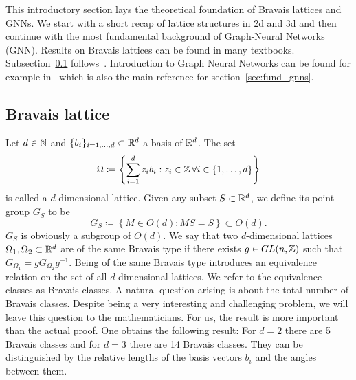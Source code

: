 This introductory section lays the theoretical foundation of Bravais lattices and GNNs. 
We start with a short recap of lattice structures in 2d and 3d and then continue with 
the most fundamental background of Graph-Neural Networks (GNN). 
Results on Bravais lattices can be found in many textbooks. Subsection~\ref{sec:brav_latt} follows~\cite{symGroupsApplications}.
Introduction to Graph Neural Networks can be found for example in~\cite{IntroMessagePassing} which is also the main reference for section~\ref{sec:fund_gnns}.

\subsection{Bravais lattice}
\label{sec:brav_latt}
Let $d\in\mathbb{N}$ and $\{b_i\}_{i=1,\dots,d}\subset \mathbb{R}^d$ a basis of $\mathbb{R}^d$. The set 
\begin{equation*}
    \Omega\coloneq\left\{\sum_{i=1}^{d}z_i b_i: z_i\in\mathbb{Z}\,\forall i\in\{1,\dots,d\}\right\}
\end{equation*}
is called a $d$-dimensional lattice. Given any subset $S\subset\mathbb{R}^d$, we define its point group $G_S$ to be
\begin{equation*}
    G_S\coloneq \left\{M\in O(d) : MS=S\right\}\subset O(d).
\end{equation*}
$G_S$ is obviously a subgroup of $O(d)$. We say that two $d$-dimensional lattices $\Omega_1, \Omega_2\subset \mathbb{R}^d$ are of the same Bravais type if
there exists $g\in GL(n,\mathbb{Z})$ such that $G_{\Omega_1}=g G_{\Omega_2} g^{-1}$. 
Being of the same Bravais type introduces an equivalence relation on the set of all $d$-dimensional lattices. We refer to the equivalence classes as Bravais classes.
A natural question arising is about the total number of Bravais classes. Despite being a very interesting and challenging problem,
we will leave this question to the mathematicians. For us, the result is more important than the actual proof. One obtains the following result:
For $d=2$ there are 5 Bravais classes and for $d=3$ there are 14 Bravais classes. 
They can be distinguished by the relative lengths of the basis vectors $b_i$ and the angles between them.

